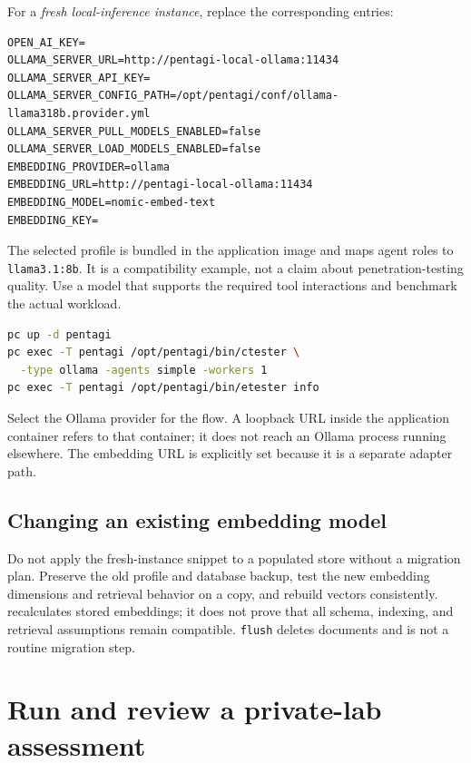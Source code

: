 \documentclass[11pt,letterpaper]{article}
\newcommand{\code}[1]{\nolinkurl{#1}}
\newcommand{\src}[1]{\cite{#1}}
\begin{document}
For a \emph{fresh local-inference instance}, replace the corresponding entries:
\begin{lstlisting}
OPEN_AI_KEY=
OLLAMA_SERVER_URL=http://pentagi-local-ollama:11434
OLLAMA_SERVER_API_KEY=
OLLAMA_SERVER_CONFIG_PATH=/opt/pentagi/conf/ollama-llama318b.provider.yml
OLLAMA_SERVER_PULL_MODELS_ENABLED=false
OLLAMA_SERVER_LOAD_MODELS_ENABLED=false
EMBEDDING_PROVIDER=ollama
EMBEDDING_URL=http://pentagi-local-ollama:11434
EMBEDDING_MODEL=nomic-embed-text
EMBEDDING_KEY=
\end{lstlisting}
The selected profile is bundled in the application image and maps agent roles
to \code{llama3.1:8b}. It is a compatibility example, not a claim about
penetration-testing quality. Use a model that supports the required tool
interactions and benchmark the actual workload. \src{ollama-profile,ollama-tools}

\begin{lstlisting}[language=bash]
pc up -d pentagi
pc exec -T pentagi /opt/pentagi/bin/ctester \
  -type ollama -agents simple -workers 1
pc exec -T pentagi /opt/pentagi/bin/etester info
\end{lstlisting}
Select the Ollama provider for the flow. A loopback URL inside the application
container refers to that container; it does not reach an Ollama process running
elsewhere. The embedding URL is explicitly set because it is a separate
adapter path. \src{ollama-doc,embedding}

\subsection{Changing an existing embedding model}
Do not apply the fresh-instance snippet to a populated store without a migration
plan. Preserve the old profile and database backup, test the new embedding
dimensions and retrieval behavior on a copy, and rebuild vectors consistently.
\texttt{\detokenize{etester reindex}} recalculates stored embeddings; it does not prove that all
schema, indexing, and retrieval assumptions remain compatible. \code{flush}
deletes documents and is not a routine migration step. \src{reindex,etester,ollama-embeddings}

\clearpage
\section{Run and review a private-lab assessment}
\label{sec:lab}
\end{document}
